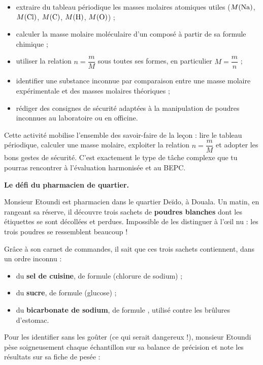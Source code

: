 \documentclass[11pt]{article}
\newcommand{\cle}[1]{{\popxbold\color{popdark}#1}}
\newcounter{popsec}
\newcounter{popsub}
\newcommand{\courssub}[1]{%
  \stepcounter{popsub}%
  \par\vspace{9pt}\noindent{\popxbold\fontsize{11.5}{13}\selectfont\color{popink}{\color{poporange}\thepopsec.\thepopsub}\hspace{6pt}#1}\par\nopagebreak\vspace{4pt}
}
\begin{document}
\begin{itemize}
\item extraire du tableau périodique les masses molaires atomiques utiles ($M(\ce{Na})$, $M(\ce{Cl})$, $M(\ce{C})$, $M(\ce{H})$, $M(\ce{O})$) ;
\item calculer la \cle{masse molaire moléculaire} d'un composé à partir de sa formule chimique ;
\item utiliser la relation $n = \dfrac{m}{M}$ sous toutes ses formes, en particulier $M = \dfrac{m}{n}$ ;
\item identifier une substance inconnue par comparaison entre une masse molaire expérimentale et des masses molaires théoriques ;
\item rédiger des consignes de sécurité adaptées à la manipulation de poudres inconnues au laboratoire ou en officine.
\end{itemize}

\begin{aretenir}
Cette activité mobilise l'ensemble des savoir-faire de la leçon : lire le tableau périodique, calculer une masse molaire, exploiter la relation $n = \dfrac{m}{M}$ et adopter les bons gestes de sécurité. C'est exactement le type de tâche complexe que tu pourras rencontrer à l'évaluation harmonisée et au BEPC.
\end{aretenir}

\courssub{Situation}

\textbf{Le défi du pharmacien de quartier.}

Monsieur Etoundi est pharmacien dans le quartier Deïdo, à Douala. Un matin, en rangeant sa réserve, il découvre trois sachets de \textbf{poudres blanches} dont les étiquettes se sont décollées et perdues. Impossible de les distinguer à l'œil nu : les trois poudres se ressemblent beaucoup !

Grâce à son carnet de commandes, il sait que ces trois sachets contiennent, dans un ordre inconnu :

\begin{itemize}
\item du \textbf{sel de cuisine}, de formule  (chlorure de sodium) ;
\item du \textbf{sucre}, de formule  (glucose) ;
\item du \textbf{bicarbonate de sodium}, de formule , utilisé contre les brûlures d'estomac.
\end{itemize}

Pour les identifier sans les goûter (ce qui serait dangereux !), monsieur Etoundi pèse soigneusement chaque échantillon sur sa balance de précision et note les résultats sur sa fiche de pesée :
\end{document}

